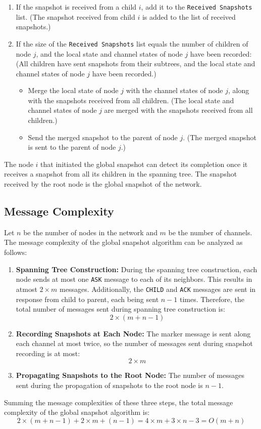 \begin{enumerate}
    \item If the snapshot is received from a child \(i\), add it to the \texttt{Received Snapshots} list. (The snapshot received from child \(i\) is added to the list of received snapshots.)
    \item If the size of the \texttt{Received Snapshots} list equals the number of children of node \(j\), and the local state and channel states of node \(j\) have been recorded: (All children have sent snapshots from their subtrees, and the local state and channel states of node \(j\) have been recorded.)
    \begin{itemize}
        \item Merge the local state of node \(j\) with the channel states of node \(j\), along with the snapshots received from all children. (The local state and channel states of node \(j\) are merged with the snapshots received from all children.)
        \item Send the merged snapshot to the parent of node \(j\). (The merged snapshot is sent to the parent of node \(j\).)
    \end{itemize}
\end{enumerate}

The node \(i\) that initiated the global snapshot can detect its completion once it receives a snapshot from all its children in the spanning tree. The snapshot received by the root node is the global snapshot of the network.

\subsection{Message Complexity}

Let \(n\) be the number of nodes in the network and \(m\) be the number of channels. The message complexity of the global snapshot algorithm can be analyzed as follows:

\begin{enumerate}
    \item \textbf{Spanning Tree Construction:} During the spanning tree construction, each node sends at most one \texttt{ASK} message to each of its neighbors. This results in atmost \(2 \times m\) messages. Additionally, the \texttt{CHILD} and \texttt{ACK} messages are sent in response from child to parent, each being sent \(n-1\) times. Therefore, the total number of messages sent during spanning tree construction is:
    \[
    2 \times (m + n - 1)
    \]
    
    \item \textbf{Recording Snapshots at Each Node:} The marker message is sent along each channel at most twice, so the number of messages sent during snapshot recording is at most:
    \[
    2 \times m
    \]
    
    \item \textbf{Propagating Snapshots to the Root Node:} The number of messages sent during the propagation of snapshots to the root node is \(n-1\).
\end{enumerate}

Summing the message complexities of these three steps, the total message complexity of the global snapshot algorithm is:
\[
2 \times (m + n - 1) + 2 \times m + (n - 1) = 4 \times m + 3 \times n - 3 = O(m + n)
\]

